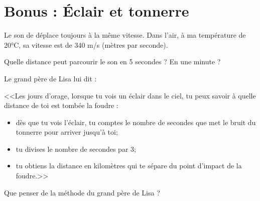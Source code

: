\section{Bonus : \'Eclair et tonnerre}

Le son de déplace toujours à la même vitesse. Dans l'air, à ma température de 20°C, sa vitesse est de 340 m/s (mètres par seconde).

\begin{questions}
	\question Quelle distance peut parcourir le son en 5 secondes ? En une minute ?
	
	\question Le grand père de Lisa lui dit :
	
	<<Les jours d'orage, lorsque tu vois un éclair dans le ciel, tu peux savoir à quelle distance de toi est tombée la foudre :
	
	\begin{itemize}
		\item dès que tu vois l'éclair, tu comptes le nombre de secondes que met le bruit du tonnerre pour arriver jusqu'à toi;
		
		\item tu divises le nombre de secondes par 3;
		
		\item tu obtiens la distance en kilomètres qui te sépare du point d'impact de la foudre.>>
		 
	\end{itemize}

	Que penser de la méthode du grand père de Lisa ?
\end{questions}